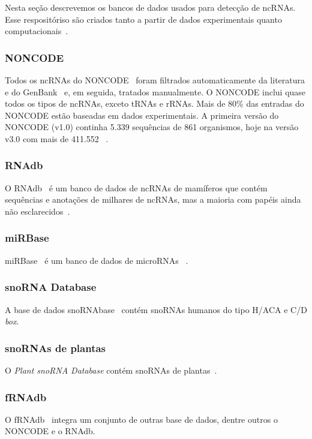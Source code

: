 Nesta seção descrevemos os bancos de dados usados para detecção de ncRNAs. Esse respositóriso são criados tanto a partir de dados experimentais quanto computacionais~\citep{solda2009ariadne:2009}.

\subsubsection*{NONCODE}

Todos os ncRNAs do NONCODE~\citep{NONCODE:2012} foram filtrados automaticamente da literatura e do GenBank~\citep{Genbank:2012} e, em seguida, tratados manualmente. O NONCODE inclui quase todos os tipos de ncRNAs, exceto tRNAs e rRNAs. Mais de 80\% das entradas do NONCODE estão baseadas em dados experimentais. A primeira versão do NONCODE (v1.0) continha 5.339 sequências de 861 organismos, hoje na versão v3.0 com mais de 411.552 ~\citep{liu2005noncode:2005}.

\subsubsection*{RNAdb}
O RNAdb~\citep{RNAdb:2012} é um banco de dados de ncRNAs de mamíferos que contém sequências e anotações de milhares de ncRNAs, mas a maioria com papéis ainda não esclarecidos~\citep{pang2007rnadb:2007}.

\subsubsection*{miRBase}
miRBase~\citep{miRBase:2012} é um banco de dados de microRNAs ~\citep{jones:2006}.

\subsubsection*{snoRNA Database}
A base de dados snoRNAbase~\citep{snoRNAbase:2012,lestrade2006snorna:2006} contém snoRNAs humanos do tipo H/ACA e C/D \textsl{box}.


\subsubsection*{snoRNAs de plantas}
O \textsl{Plant snoRNA Database} contém snoRNAs de plantas~\citep{PlantsnoRNA:2012,brown2003plant:2003}.

\subsubsection*{fRNAdb}
O fRNAdb~\citep{mituyama2009functional:2009} integra um conjunto de outras base de dados, dentre outros o NONCODE
e o RNAdb.


